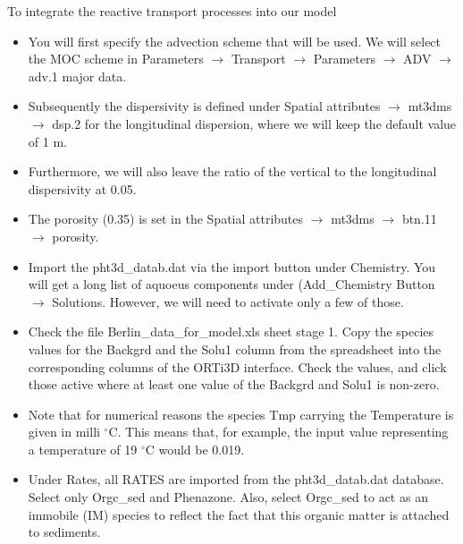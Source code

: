 To integrate the reactive transport processes into our model 

\begin{itemize}
\item You will first specify the advection scheme that will be used. 
We will select the MOC scheme in 
{\color{blue}Parameters} $\rightarrow$ {\color{blue}Transport} $\rightarrow$ {\color{blue}Parameters} 
$\rightarrow$ {\color{blue}ADV} $\rightarrow$ {\color{blue}adv.1 major data}.
 
\item Subsequently the dispersivity is defined under
{\color{blue}Spatial attributes} $\rightarrow$ {\color{blue}mt3dms} $\rightarrow$ {\color{blue}dsp.2} 
for the longitudinal dispersion, where we will keep the default value of 1 m.

\item Furthermore, we will also leave the ratio of the vertical to 
the longitudinal dispersivity at 0.05. 

\item The porosity (0.35) is set in the 
{\color{blue}Spatial attributes} $\rightarrow$ {\color{blue}mt3dms} $\rightarrow$ 
{\color{blue}btn.11} $\rightarrow$ {\color{blue}porosity}. 

\item Import the pht3d\_datab.dat via the import button under Chemistry. 
You will get a long list of aquoeus components under 
{\color{blue}(Add\_Chemistry} Button $\rightarrow$ {\color{blue}Solutions}. 
However, we will need to activate only a few of those.

\item Check the file {\color{blue}Berlin\_data\_for\_model.xls} sheet stage 1. 
Copy the species values for the {\color{blue}Backgrd} and the {\color{blue}Solu1} column 
from the spreadsheet into the corresponding columns of the ORTi3D interface. 
Check the values, and click those active where at least one value of 
the {\color{blue}Backgrd} and {\color{blue}Solu1} is non-zero. 

\item Note that for numerical reasons 
the species Tmp carrying the Temperature is given in milli $^\circ$C.
This means that, for example, the input value representing a 
temperature of 19 $^\circ$C would be 0.019.

\item Under {\color{blue}Rates}, all {\color{blue}RATES} are imported 
from the {\color{blue}pht3d\_datab.dat} database. 
Select only {\color{blue}Orgc\_sed} and {\color{blue}Phenazone}. 
Also, select {\color{blue}Orgc\_sed} to act as an immobile (IM) species
to reflect the fact that this organic matter is attached to sediments.
\end{itemize}


